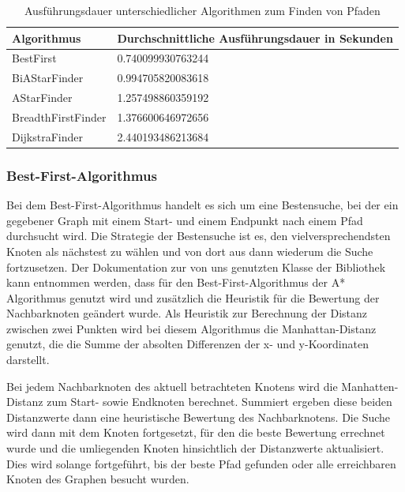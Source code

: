 \begin{table}[htb]
    \centering
    \begin{tabular}{|l|l|}
        \hline
            \textbf{Algorithmus} & {\textbf{Durchschnittliche Ausführungsdauer in Sekunden}} \\ \hline
            BestFirst 		    & 0.740099930763244 \\ \hline
            BiAStarFinder 		& 0.994705820083618 \\ \hline
            AStarFinder 		& 1.257498860359192 \\ \hline
            BreadthFirstFinder  & 1.376600646972656 \\ \hline
            DijkstraFinder		& 2.440193486213684 \\ \hline
    \end{tabular}
    \caption{Ausführungsdauer unterschiedlicher Algorithmen zum Finden von Pfaden}
    \label{tab:ausfuehrungsdauer-pfadalgorithmen}
\end{table}

\subsubsection*{Best-First-Algorithmus}
\label{subsubsec:best-first-algorithm}

Bei dem Best-First-Algorithmus handelt es sich um eine Bestensuche, bei der ein gegebener Graph mit einem Start- und
einem Endpunkt nach einem Pfad durchsucht wird.
Die Strategie der Bestensuche ist es, den vielversprechendsten Knoten als nächstest zu wählen und von dort aus dann
wiederum die Suche fortzusetzen.
Der Dokumentation zur von uns genutzten Klasse  der Bibliothek  kann entnommen werden,
dass für den Best-First-Algorithmus der A* Algorithmus genutzt wird und zusätzlich die Heuristik für die Bewertung der
Nachbarknoten geändert wurde.
Als Heuristik zur Berechnung der Distanz zwischen zwei Punkten wird bei diesem Algorithmus die Manhattan-Distanz
genutzt, die die Summe der absolten Differenzen der x- und y-Koordinaten darstellt. 

Bei jedem Nachbarknoten des aktuell betrachteten Knotens wird die Manhatten-Distanz zum Start- sowie Endknoten
berechnet.
Summiert ergeben diese beiden Distanzwerte dann eine heuristische Bewertung des Nachbarknotens.
Die Suche wird dann mit dem Knoten fortgesetzt, für den die beste Bewertung errechnet wurde und die umliegenden Knoten
hinsichtlich der Distanzwerte aktualisiert.
Dies wird solange fortgeführt, bis der beste Pfad gefunden oder alle erreichbaren Knoten des Graphen besucht wurden.

